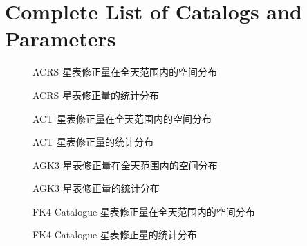 \documentclass{aastex701}
\begin{document}




\appendix

\section{Complete List of Catalogs and Parameters} \label{app:catalogs}

\begin{figure}[ht!]
\caption{ACRS 星表修正量在全天范围内的空间分布}
\label{fig:bias_acrs_2x2}
\end{figure}

\begin{figure}[ht!]
\caption{ACRS 星表修正量的统计分布}
\label{fig:hist_acrs}
\end{figure}

\begin{figure}[ht!]
\caption{ACT 星表修正量在全天范围内的空间分布}
\label{fig:bias_act_2x2}
\end{figure}

\begin{figure}[ht!]
\caption{ACT 星表修正量的统计分布}
\label{fig:hist_act}
\end{figure}

\begin{figure}[ht!]
\caption{AGK3 星表修正量在全天范围内的空间分布}
\label{fig:bias_agk3_2x2}
\end{figure}

\begin{figure}[ht!]
\caption{AGK3 星表修正量的统计分布}
\label{fig:hist_agk3}
\end{figure}

\begin{figure}[ht!]
\caption{FK4 Catalogue 星表修正量在全天范围内的空间分布}
\label{fig:bias_fk4catalogue_2x2}
\end{figure}

\begin{figure}[ht!]
\caption{FK4 Catalogue 星表修正量的统计分布}
\label{fig:hist_fk4catalogue}
\end{figure}
\end{document}
